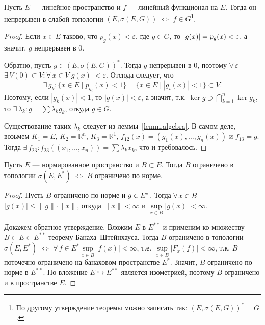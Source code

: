 \documentclass[12pt,titlepage, a4paper]{article}
\begin{document}
\begin{theorem}
Пусть $E$ --- линейное пространство и $f$ --- линейный функционал на
$E$. Тогда он непрерывен в слабой топологии $(E,\sigma(E,G))$
$\Leftrightarrow$ $f\in G$\footnote{По другому утверждение теоремы
можно записать так: $(E,\sigma(E,G))^*=G$.}.
\end{theorem}

\begin{proof}
Если $x\in E$ таково, что $p_g(x)<\varepsilon$, где $g\in G$, то
$|g(x)|\p=p_g(x)<\varepsilon$, а значит, $g$ непрерывен в 0.

Обратно, пусть $g\in (E,\sigma(E,G))^*$. Тогда $g$ непрерывен в 0,
поэтому $\forall\,\varepsilon$\;\;$\exists\,V(0)\subset
V:\forall\,x\in V$\;\;$|g(x)|<\varepsilon$. Отсюда следует, что
$$\exists\, g_k:\{x\in E\mid p_{g_i}(x)<1\}=\{x\in E\mid
|g_i(x)|<1\}\subset V.$$ Поэтому, если $|g_k(x)|<1$, то
$|g(x)|<\varepsilon$, а значит, т.к. $\ker g\supset
\bigcap\limits_{k=1}^n\ker g_k$, то $\exists\,
\lambda_k:g=\sum\lambda_kg_k$, откуда $g\in G$.

Существование таких $\lambda_k$ следует из леммы~\ref{lemm.algebra}.
В самом деле, возьмем $K_1=E$, $K_2=\mathbb{R}^n$,
$K_3=\mathbb{R}^1$, $f_{12}(x)=(g_1(x),\ldots,g_n(x))$ и $f_{13}=g$.
Тогда $\exists\,f_{23}:f_{23}((x_1,\ldots,x_n))=\sum\lambda_kx_k$,
что и требовалось.
\end{proof}

\begin{theorem}
Пусть $E$ --- нормированное пространство и $B\subset E$. Тогда $B$
ограничено в топологии $\sigma(E, E^*)$ $\Leftrightarrow$ $B$
ограничено по норме.
\end{theorem}

\begin{proof}
Пусть $B$ ограничено по норме и $g\p\in E^*$. Тогда $\forall\,x\p\in
B$\;\;$|g(x)|\leqslant \|g\|\cdot\|x\|$, откуда $\|x\|<\infty$ и
$\sup\limits_{x\in B}|g(x)|<\infty$.

Докажем обратное утверждение. Вложим $E$ в $E^{**}$ и применим ко
множеству $B\subset E\subset E^{**}$ теорему Банаха--Штейнхауса.
Тогда $B$ ограничено в топологии $\sigma(E,E^*)$ $\Leftrightarrow$
$\forall\,f\in E^*$\;\;$\sup\limits_{x\in B}|f(x)|<\infty$, т.е.
$\sup\limits_{x\in B}|F_x(f)|<\infty$, т.к. $B$ поточечно ограничено
на банаховом пространстве $E^*$. Значит, $B$ ограничено по норме в
$E^{**}$. Но вложение $E\hookrightarrow E^{**}$ является изометрией,
поэтому $B$ ограничено и в пространстве $E$.
\end{proof}
\end{document}
